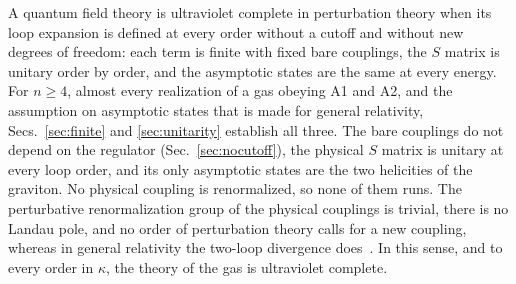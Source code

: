 \documentclass[aps,prd,10pt,twocolumn,superscriptaddress,nofootinbib,floatfix,longbibliography]{revtex4-2}
\begin{document}
A quantum field theory is ultraviolet complete in perturbation theory when its loop expansion is defined at every order without a cutoff and without new degrees of freedom: each term is finite with fixed bare couplings, the $S$ matrix is unitary order by order, and the asymptotic states are the same at every energy. For $n\ge4$, almost every realization of a gas obeying A1 and A2, and the assumption on asymptotic states that is made for general relativity, Secs.~\ref{sec:finite} and \ref{sec:unitarity} establish all three. The bare couplings do not depend on the regulator (Sec.~\ref{sec:nocutoff}), the physical $S$ matrix is unitary at every loop order, and its only asymptotic states are the two helicities of the graviton. No physical coupling is renormalized, so none of them runs. The perturbative renormalization group of the physical couplings is trivial, there is no Landau pole, and no order of perturbation theory calls for a new coupling, whereas in general relativity the two-loop divergence does~\cite{GoroffSagnotti1986}. In this sense, and to every order in $\kappa$, the theory of the gas is ultraviolet complete.
\end{document}
